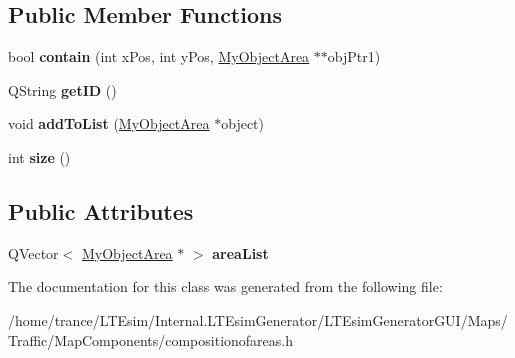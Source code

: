 \subsection*{Public Member Functions}
\begin{DoxyCompactItemize}
\item 
bool {\bfseries contain} (int x\+Pos, int y\+Pos, \hyperlink{class_my_object_area}{My\+Object\+Area} $\ast$$\ast$obj\+Ptr1)\hypertarget{class_composition_of_areas_aad6ff29c838a7b9aceaa48638c9249da}{}\label{class_composition_of_areas_aad6ff29c838a7b9aceaa48638c9249da}

\item 
Q\+String {\bfseries get\+ID} ()\hypertarget{class_composition_of_areas_aef1b4af535f22f35c5d6bfb91230754e}{}\label{class_composition_of_areas_aef1b4af535f22f35c5d6bfb91230754e}

\item 
void {\bfseries add\+To\+List} (\hyperlink{class_my_object_area}{My\+Object\+Area} $\ast$object)\hypertarget{class_composition_of_areas_a466347d7848229c6bec2f6b8f492bde0}{}\label{class_composition_of_areas_a466347d7848229c6bec2f6b8f492bde0}

\item 
int {\bfseries size} ()\hypertarget{class_composition_of_areas_a2afe45db6f26b3fcd68bc27bc199b811}{}\label{class_composition_of_areas_a2afe45db6f26b3fcd68bc27bc199b811}

\end{DoxyCompactItemize}
\subsection*{Public Attributes}
\begin{DoxyCompactItemize}
\item 
Q\+Vector$<$ \hyperlink{class_my_object_area}{My\+Object\+Area} $\ast$ $>$ {\bfseries area\+List}\hypertarget{class_composition_of_areas_aaceb49cf077b77910375af9a3b52f777}{}\label{class_composition_of_areas_aaceb49cf077b77910375af9a3b52f777}

\end{DoxyCompactItemize}


The documentation for this class was generated from the following file\+:\begin{DoxyCompactItemize}
\item 
/home/trance/\+L\+T\+Esim/\+Internal.\+L\+T\+Esim\+Generator/\+L\+T\+Esim\+Generator\+G\+U\+I/\+Maps/\+Traffic/\+Map\+Components/compositionofareas.\+h\end{DoxyCompactItemize}
